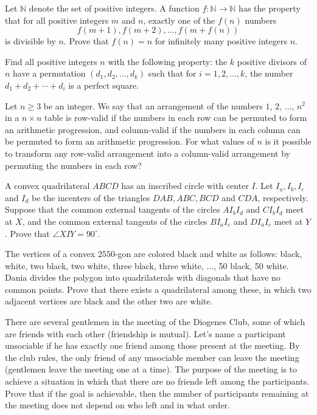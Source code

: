 \documentclass[11pt]{scrartcl}
\begin{document}
\begin{problem}[1598288382590173390]
Let $\mathbb N$ denote the set of positive integers. A function $f\colon\mathbb N\to\mathbb N$ has the property that for all positive integers $m$ and $n$, exactly one of the $f(n)$ numbers
\[f(m+1),f(m+2),\ldots,f(m+f(n))\]is divisible by $n$. Prove that $f(n)=n$ for infinitely many positive integers $n$.
\end{problem}
\begin{problem}[297274918587198]
	Find all positive integers $n$ with the following property: the $k$ positive divisors of $n$ have a permutation $(d_1,d_2,\ldots,d_k)$ such that for $i=1,2,\ldots,k$, the number $d_1+d_2+\cdots+d_i$ is a perfect square.
\end{problem}
\begin{problem}[274933009357884]
Let $n\geq3$ be an integer. We say that an arrangement of the numbers $1$, $2$, $\dots$, $n^2$ in a $n \times n$ table is row-valid if the numbers in each row can be permuted to form an arithmetic progression, and column-valid if the numbers in each column can be permuted to form an arithmetic progression. For what values of $n$ is it possible to transform any row-valid arrangement into a column-valid arrangement by permuting the numbers in each row?
\end{problem}
\begin{problem}[4451072691230235426]
A convex quadrilateral $ABCD$ has an inscribed circle with center $I$. Let $I_a, I_b, I_c$ and $I_d$ be the incenters of the triangles $DAB, ABC, BCD$ and $CDA$, respectively. Suppose that the common external tangents of the circles $AI_bI_d$ and $CI_bI_d$ meet at $X$, and the common external tangents of the circles $BI_aI_c$ and $DI_aI_c$ meet at $Y$. Prove that $\angle{XIY}=90^{\circ}$.
\end{problem}
\begin{problem}[5395714337110519657]
The vertices of a convex $2550$-gon are colored black and white as follows: black, white, two black, two white, three black, three white, ..., 50 black, 50 white. Dania divides the polygon into quadrilaterals with diagonals that have no common points. Prove that there exists a quadrilateral among these, in which two adjacent vertices are black and the other two are white.
\end{problem}
\begin{problem}[645068477920006]
There are several gentlemen in the meeting of the Diogenes Club, some of which are friends with each other (friendship is mutual). Let's name a participant unsociable if he has exactly one friend among those present at the meeting. By the club rules, the only friend of any unsociable member can leave the meeting (gentlemen leave the meeting one at a time). The purpose of the meeting is to achieve a situation in which that there are no friends left among the participants. Prove that if the goal is achievable, then the number of participants remaining at the meeting does not depend on who left and in what order.
\end{problem}
\end{document}
